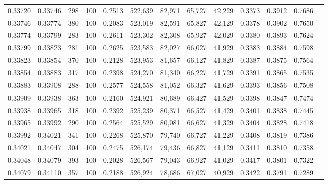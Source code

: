 \begin{tabular}{rrrrrrrrrrrrr}
0.33720 & 0.33746 &   298 & 100 &                                     0.2513 & 522,639 &  82,971 &  65,727 &  42,229 & 0.3373 & 0.3912 & 0.7686 \\
0.33746 & 0.33774 &   380 & 100 &                                     0.2083 & 523,019 &  82,591 &  65,827 &  42,129 & 0.3378 & 0.3902 & 0.7650 \\
0.33774 & 0.33799 &   283 & 100 &                                     0.2611 & 523,302 &  82,308 &  65,927 &  42,029 & 0.3380 & 0.3893 & 0.7624 \\
0.33799 & 0.33823 &   281 & 100 &                                     0.2625 & 523,583 &  82,027 &  66,027 &  41,929 & 0.3383 & 0.3884 & 0.7598 \\
0.33823 & 0.33854 &   370 & 100 &                                     0.2128 & 523,953 &  81,657 &  66,127 &  41,829 & 0.3387 & 0.3875 & 0.7564 \\
0.33854 & 0.33883 &   317 & 100 &                                     0.2398 & 524,270 &  81,340 &  66,227 &  41,729 & 0.3391 & 0.3865 & 0.7535 \\
0.33883 & 0.33908 &   288 & 100 &                                     0.2577 & 524,558 &  81,052 &  66,327 &  41,629 & 0.3393 & 0.3856 & 0.7508 \\
0.33909 & 0.33938 &   363 & 100 &                                     0.2160 & 524,921 &  80,689 &  66,427 &  41,529 & 0.3398 & 0.3847 & 0.7474 \\
0.33938 & 0.33965 &   318 & 100 &                                     0.2392 & 525,239 &  80,371 &  66,527 &  41,429 & 0.3401 & 0.3838 & 0.7445 \\
0.33965 & 0.33992 &   290 & 100 &                                     0.2564 & 525,529 &  80,081 &  66,627 &  41,329 & 0.3404 & 0.3828 & 0.7418 \\
0.33992 & 0.34021 &   341 & 100 &                                     0.2268 & 525,870 &  79,740 &  66,727 &  41,229 & 0.3408 & 0.3819 & 0.7386 \\
0.34021 & 0.34047 &   304 & 100 &                                     0.2475 & 526,174 &  79,436 &  66,827 &  41,129 & 0.3411 & 0.3810 & 0.7358 \\
0.34048 & 0.34079 &   393 & 100 &                                     0.2028 & 526,567 &  79,043 &  66,927 &  41,029 & 0.3417 & 0.3801 & 0.7322 \\
0.34079 & 0.34110 &   357 & 100 &                                     0.2188 & 526,924 &  78,686 &  67,027 &  40,929 & 0.3422 & 0.3791 & 0.7289 \\

\end{tabular}

